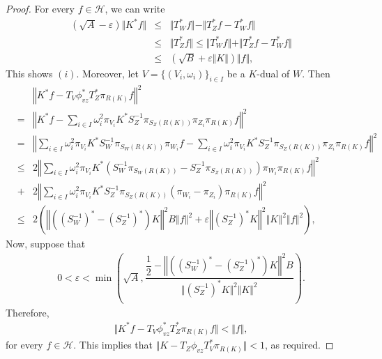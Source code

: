 \documentclass{birkjour}
\theoremstyle{definition}
\theoremstyle{remark}
\numberwithin{equation}{section}
\begin{document}
\begin{proof} For every $f\in \mathcal{H}$, we can write \begin{eqnarray*}
(\sqrt{A}-\varepsilon) \Vert K^{*}f\Vert &\leq& \Vert T^{*}_{W}f\Vert -\Vert
T^{*}_{Z}f-T^{*}_{W}f\Vert\\ &\leq& \Vert T^{*}_{Z}f\Vert \leq \Vert
T^{*}_{W}f\Vert +\Vert T^{*}_{Z}f-T^{*}_{W}f\Vert
\\ &\leq& (\sqrt{B} + \varepsilon \Vert K\Vert)\Vert f\Vert, \end{eqnarray*}
This shows $(i)$. Moreover, let  $V=\lbrace(V_{i},\omega_{i})\rbrace_{i\in I}$ be a $K$-dual  of $W$. Then
\begin{eqnarray*}
&& \left\Vert K^{*}f - T_{V}\phi_{vz}^{*}T_{Z}^{*}\pi_{R(K)}f\right\Vert^{2}\\
&=& \left\Vert K^{*}f -\sum_{i\in I}\omega_{i}^{2}\pi_{V_{i}}K^{*}S_{Z}^{-1}\pi_{S_{Z}(R(K))}\pi_{Z_{i}}\pi_{R(K)}f
\right \Vert^{2}\\
&=&\left \Vert \sum_{i\in I}\omega_{i}^{2}\pi_{V_{i}}K^{*}S_{W}^{-1}\pi_{S_{W}(R(K))}\pi_{W_{i}}f
-\sum_{i\in I}\omega_{i}^{2}\pi_{V_{i}}K^{*}S_{Z}^{-1}\pi_{S_{Z}(R(K))}\pi_{Z_{i}}\pi_{R(K)}f
\right \Vert^{2}\\
&\leq&  2\left \Vert \sum_{i\in I}\omega_{i}^{2}\pi_{V_{i}}K^{*}(S_{W}^{-1}\pi_{S_{W}(R(K))}-S_{Z}^{-1}\pi_{S_{Z}(R(K))})\pi_{W_{i}}\pi_{R(K)}f\right \Vert^{2}\\
&+&2\left\Vert \sum_{i\in I}\omega_{i}^{2}\pi_{V_{i}}K^{*}S_{Z}^{-1}\pi_{S_{Z}(R(K))}(\pi_{W_{i}}-\pi_{Z_{i}})\pi_{R(K)}f
\right \Vert^{2}\\
&\leq& 2\left( \left\Vert \left((S_{W}^{-1})^{*}-(S_{Z}^{-1})^{*}\right)K\right\Vert^{2}B\left\Vert f \right\Vert^{2} + \varepsilon\left\Vert (S_{Z}^{-1})^{*}K\right\Vert^{2}\left\Vert K\right\Vert^{2}\left\Vert f\right\Vert^{2}
\right),
\end{eqnarray*}
Now, suppose that
\begin{eqnarray*}
0 < \varepsilon < \min \left( \sqrt{A}, \dfrac{\dfrac{1}{2} -\left\Vert \left((S_{W}^{-1})^{*}-(S_{Z}^{-1})^{*}\right)K\right\Vert^{2}B}{\Vert (S_{Z}^{-1})^{*}K\Vert^{2}\Vert K\Vert^{2}} \right).
\end{eqnarray*}
Therefore,
\begin{eqnarray*}
\Vert K^{*}f - T_{V}\phi_{vz}^{*}T_{Z}^{*}\pi_{R(K)}f\Vert< \Vert f\Vert,
\end{eqnarray*}
for every $f\in \mathcal{H}$.  This implies that  $\Vert K -  T_{Z}\phi_{vz}T^{*}_{V}\pi_{R(K)}\Vert< 1$, as required.
\end{proof}
\end{document}
